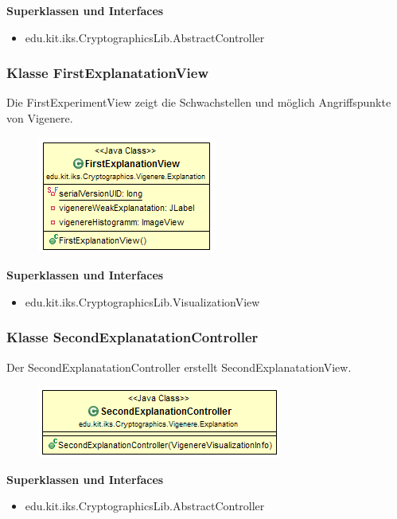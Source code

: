 \documentclass{article}
\begin{document}
      \textbf{Superklassen und Interfaces}
      \begin{itemize}
        \item edu.kit.iks.CryptographicsLib.AbstractController
      \end{itemize}

    \subsubsection{Klasse FirstExplanatationView}
      Die FirstExperimentView zeigt die Schwachstellen und möglich Angriffspunkte von Vigenere.
      \begin{figure}[H]
        \centering
        \includegraphics{resources/edu-kit-iks-Cryptographics-Vigenere-FirstExplanationView}
      \end{figure}

      \textbf{Superklassen und Interfaces}
      \begin{itemize}
        \item edu.kit.iks.CryptographicsLib.VisualizationView
      \end{itemize}

    \subsubsection{Klasse SecondExplanatationController}
      Der SecondExplanatationController erstellt SecondExplanatationView.
      \begin{figure}[H]
        \centering
        \includegraphics{resources/edu-kit-iks-Cryptographics-Vigenere-SecondExplanationController}
      \end{figure}

      \textbf{Superklassen und Interfaces}
      \begin{itemize}
        \item edu.kit.iks.CryptographicsLib.AbstractController
      \end{itemize}
\end{document}
